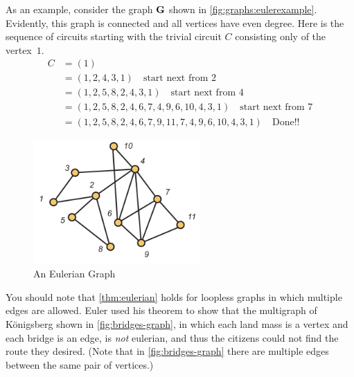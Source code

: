 As an example, consider the graph $\mathbf{G}$ shown in \autoref{fig:graphs:eulerexample}.
Evidently, this graph is connected and all vertices have even degree.
Here is the sequence of circuits starting with the trivial circuit $C$
consisting only of the vertex~$1$.
\begin{align*}
C &=(1)\\
  &=(1,2,4,3,1)\quad \text{start next from $2$}\\ 
  &=(1,2,5,8,2,4,3,1)\quad\text{start next from $4$}\\
  &=(1,2,5,8,2,4,6,7,4,9,6,10,4,3,1)\quad\text{start next from $7$}\\
  &=(1,2,5,8,2,4,6,7,9,11,7,4,9,6,10,4,3,1)\quad\text{Done!!}
\end{align*}	
  
\begin{figure}
  \centering
  \includegraphics[width=2.5in]{graphs-figs/eulerian_graph}

  \caption{An Eulerian Graph}
  \label{fig:graphs:eulerexample}
\end{figure}
You should note that \autoref{thm:eulerian} holds for loopless graphs
in which multiple edges are allowed.  Euler used his theorem to show
that the multigraph of K\"onigsberg shown in
\autoref{fig:bridges-graph}, in which each land mass is a vertex and
each bridge is an edge, is \textit{not} eulerian, and thus the
citizens could not find the route they desired. (Note that in
\autoref{fig:bridges-graph} there are multiple edges between the same
pair of vertices.)

